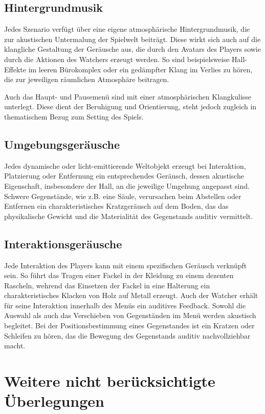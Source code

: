 \subsection{Hintergrundmusik}

Jedes Szenario verfügt über eine eigene atmosphärische Hintergrundmusik, die zur akustischen Untermalung der Spielwelt beiträgt. Diese wirkt sich auch auf die klangliche Gestaltung der Geräusche aus, die durch den Avatars des Players sowie durch die Aktionen des Watchers erzeugt werden. So sind beispielsweise Hall-Effekte im leeren Bürokomplex oder ein gedämpfter Klang im Verlies zu hören, die zur jeweiligen räumlichen Atmosphäre beitragen.

Auch das Haupt- und Pausemenü sind mit einer atmosphärischen Klangkulisse unterlegt. Diese dient der Beruhigung und Orientierung, steht jedoch zugleich in thematischem Bezug zum Setting des Spiels.

\subsection{Umgebungsgeräusche}

Jedes dynamische oder licht-emittierende Weltobjekt erzeugt bei Interaktion, Platzierung oder Entfernung ein entsprechendes Geräusch, dessen akustische Eigenschaft, insbesondere der Hall, an die jeweilige Umgehung angepasst sind. Schwere Gegenstände, wie z.B. eine Säule, verursachen beim Abstellen oder Entfernen ein charakteristisches Kratzgeräusch auf dem Boden, das das physikalische Gewicht und die Materialität des Gegenstands auditiv vermittelt.


\subsection{Interaktionsgeräusche}

Jede Interaktion des Players kann mit einem spezifischen Geräusch verknüpft sein. So führt das Tragen einer Fackel in der Kleidung zu einem dezenten Rascheln, wehrend das Einsetzen der Fackel in eine Halterung ein charakteristisches Klacken von Holz auf Metall erzeugt. Auch der Watcher erhält für seine Interaktion innerhalb des Menüs ein auditives Feedback. Sowohl die Auswahl als auch das Verschieben von Gegenständen im Menü werden akustisch begleitet. Bei der Positionsbestimmung eines Gegenstandes ist ein Kratzen oder Schleifen zu hören, das die Bewegung des Gegenstands auditiv nachvollziehbar macht.


\section{Weitere nicht berücksichtigte Überlegungen}

